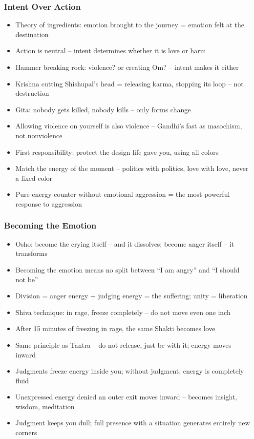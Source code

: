 \begin{frame}[fragile]\frametitle{Intent Over Action}
  \begin{itemize}
    \item Theory of ingredients: emotion brought to the journey = emotion felt at the destination
    \item Action is neutral -- intent determines whether it is love or harm
    \item Hammer breaking rock: violence? or creating Om? -- intent makes it either
    \item Krishna cutting Shishupal's head = releasing karma, stopping its loop -- not destruction
    \item Gita: nobody gets killed, nobody kills -- only forms change
    \item Allowing violence on yourself is also violence -- Gandhi's fast as masochism, not nonviolence
    \item First responsibility: protect the design life gave you, using all colors
    \item Match the energy of the moment -- politics with politics, love with love, never a fixed color
    \item Pure energy counter without emotional aggression = the most powerful response to aggression
  \end{itemize}
\end{frame}

\begin{frame}[fragile]\frametitle{Becoming the Emotion}
  \begin{itemize}
    \item Osho: become the crying itself -- and it dissolves; become anger itself -- it transforms
    \item Becoming the emotion means no split between ``I am angry'' and ``I should not be''
    \item Division = anger energy + judging energy = the suffering; unity = liberation
    \item Shiva technique: in rage, freeze completely -- do not move even one inch
    \item After 15 minutes of freezing in rage, the same Shakti becomes love
    \item Same principle as Tantra -- do not release, just be with it; energy moves inward
    \item Judgments freeze energy inside you; without judgment, energy is completely fluid
    \item Unexpressed energy denied an outer exit moves inward -- becomes insight, wisdom, meditation
    \item Judgment keeps you dull; full presence with a situation generates entirely new corners
  \end{itemize}
\end{frame}


